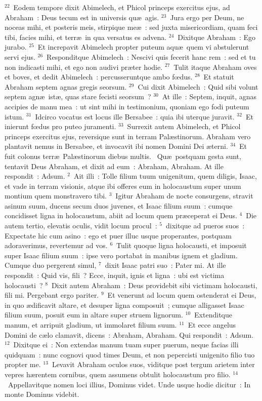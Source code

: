 ${}^{22}$~Eodem tempore dixit Abimelech, et Phicol princeps exercitus ejus, ad Abraham~: Deus tecum est in universis qu\ae\ agis.
${}^{23}$~Jura ergo per Deum, ne noceas mihi, et posteris meis, stirpique me\ae~: sed juxta misericordiam, quam feci tibi, facies mihi, et terr\ae\ in qua versatus es advena.
${}^{24}$~Dixitque Abraham~: Ego jurabo.
${}^{25}$~Et increpavit Abimelech propter puteum aqu\ae\ quem vi abstulerunt servi ejus.
${}^{26}$~Responditque Abimelech~: Nescivi quis fecerit hanc rem~: sed et tu non indicasti mihi, et ego non audivi pr\ae ter hodie.
${}^{27}$~Tulit itaque Abraham oves et boves, et dedit Abimelech~: percusseruntque ambo fœdus.
${}^{28}$~Et statuit Abraham septem agnas gregis seorsum.
${}^{29}$~Cui dixit Abimelech~: Quid sibi volunt septem agn\ae\ ist\ae , quas stare fecisti seorsum~?
${}^{30}$~At ille~: Septem, inquit, agnas accipies de manu mea~: ut sint mihi in testimonium, quoniam ego fodi puteum istum.
${}^{31}$~Idcirco vocatus est locus ille Bersabee~: quia ibi uterque juravit.
${}^{32}$~Et inierunt fœdus pro puteo juramenti.
${}^{33}$~Surrexit autem Abimelech, et Phicol princeps exercitus ejus, reversique sunt in terram Pal\ae stinorum. Abraham vero plantavit nemus in Bersabee, et invocavit ibi nomen Domini Dei \ae terni.
${}^{34}$~Et fuit colonus terr\ae\ Pal\ae stinorum diebus multis.
~Qu\ae\ postquam gesta sunt, tentavit Deus Abraham, et dixit ad eum~: Abraham, Abraham. At ille respondit~: Adsum.
${}^{2}$~Ait illi~: Tolle filium tuum unigenitum, quem diligis, Isaac, et vade in terram visionis, atque ibi offeres eum in holocaustum super unum montium quem monstravero tibi.
${}^{3}$~Igitur Abraham de nocte consurgens, stravit asinum suum, ducens secum duos juvenes, et Isaac filium suum~: cumque concidisset ligna in holocaustum, abiit ad locum quem pr\ae ceperat ei Deus.
${}^{4}$~Die autem tertio, elevatis oculis, vidit locum procul~:
${}^{5}$~dixitque ad pueros suos~: Expectate hic cum asino~: ego et puer illuc usque properantes, postquam adoraverimus, revertemur ad vos.
${}^{6}$~Tulit quoque ligna holocausti, et imposuit super Isaac filium suum~: ipse vero portabat in manibus ignem et gladium. Cumque duo pergerent simul,
${}^{7}$~dixit Isaac patri suo~: Pater mi. At ille respondit~: Quid vis, fili~? Ecce, inquit, ignis et ligna~: ubi est victima holocausti~?
${}^{8}$~Dixit autem Abraham~: Deus providebit sibi victimam holocausti, fili mi. Pergebant ergo pariter.
${}^{9}$~Et venerunt ad locum quem ostenderat ei Deus, in quo \ae dificavit altare, et desuper ligna composuit~; cumque alligasset Isaac filium suum, posuit eum in altare super struem lignorum.
${}^{10}$~Extenditque manum, et arripuit gladium, ut immolaret filium suum.
${}^{11}$~Et ecce angelus Domini de c\ae lo clamavit, dicens~: Abraham, Abraham. Qui respondit~: Adsum.
${}^{12}$~Dixitque ei~: Non extendas manum tuam super puerum, neque facias illi quidquam~: nunc cognovi quod times Deum, et non pepercisti unigenito filio tuo propter me.
${}^{13}$~Levavit Abraham oculos suos, viditque post tergum arietem inter vepres h\ae rentem cornibus, quem assumens obtulit holocaustum pro filio.
${}^{14}$~Appellavitque nomen loci illius, Dominus videt. Unde usque hodie dicitur~: In monte Dominus videbit.


